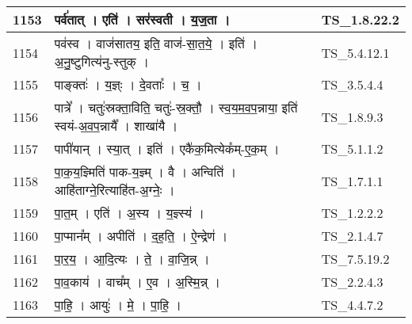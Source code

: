 \documentclass[17pt]{extarticle}
\begin{document}
\begin{longtable}{||p{0.4in}||p{4.9in}||p{0.9in}||}
    \hline
        
    1153 & पर्व॑तात्   ।   एति॑   ।   सर॑स्वती   ।   य॒ज॒ता   ।    & TS\_1.8.22.2       \\
    
    \hline
        
    1154 & पव॑स्व   ।   वाज॑सातय॒ इति॒ वाज॑{-}सा॒त॒ये॒   ।   इति॑   ।   अ॒नु॒ष्टुगित्य॑नु{-}स्तुक्   ।    & TS\_5.4.12.1       \\
    
    \hline
        
    1155 & पाङ्क्तः॑   ।   य॒ज्ञ्ः   ।   दे॒वताः᳚   ।   च॒   ।    & TS\_3.5.4.4       \\
    
    \hline
        
    1156 & पात्रे᳚   ।   चतुः॑स्रक्ता॒विति॒ चतुः॑{-}स्र॒क्तौ॒   ।   स्व॒य॒म॒व॒प॒न्नाया॒ इति॑ स्वयं{-}अ॒व॒प॒न्नायै᳚   ।   शाखा॑यै   ।    & TS\_1.8.9.3       \\
    
    \hline
        
    1157 & पापी॑यान्   ।   स्या॒त्   ।   इति॑   ।   एकै॑क॒मित्येक᳚म्{-}ए॒क॒म्   ।    & TS\_5.1.1.2       \\
    
    \hline
        
    1158 & पा॒क॒य॒ज्ञ्मिति॑ पाक{-}य॒ज्ञ्म्   ।   वै   ।   अन्विति॑   ।   आहि॑ताग्ने॒रित्याहि॑त{-}अ॒ग्नेः॒   ।    & TS\_1.7.1.1       \\
    
    \hline
        
    1159 & पा॒त॒म्   ।   एति॑   ।   अ॒स्य   ।   य॒ज्ञ्स्य॑   ।    & TS\_1.2.2.2       \\
    
    \hline
        
    1160 & पा॒प्मान᳚म्   ।   अपीति॑   ।   द॒ह॒ति॒   ।   ऐ॒न्द्रेण॑   ।    & TS\_2.1.4.7       \\
    
    \hline
        
    1161 & पा॒र॒य॒   ।   आ॒दि॒त्यः   ।   ते॒   ।   वा॒जि॒न्न्   ।    & TS\_7.5.19.2       \\
    
    \hline
        
    1162 & पा॒व॒काय॑   ।   वाच᳚म्   ।   ए॒व   ।   अ॒स्मि॒न्न्   ।    & TS\_2.2.4.3       \\
    
    \hline
        
    1163 & पा॒हि॒   ।   आयुः॑   ।   मे॒   ।   पा॒हि॒   ।    & TS\_4.4.7.2       \\
    

\end{longtable}
\end{document}
